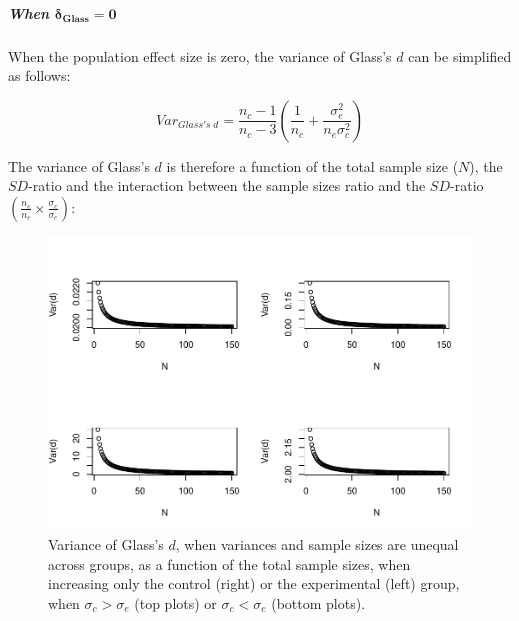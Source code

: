 \documentclass[
  english,
  man,mask]{apa6}
\let\oldsubparagraph\subparagraph
\renewcommand{\subparagraph}[1]{\oldsubparagraph{#1}\mbox{}}
\begin{document}
\hypertarget{when-bmdelta_glass-0-1}{%
\subparagraph{\texorpdfstring{When \(\bm{\delta_{Glass} = 0}\)}{When \textbackslash bm\{\textbackslash delta\_\{Glass\} = 0\}}}\label{when-bmdelta_glass-0-1}}

When the population effect size is zero, the variance of Glass's \(d\) can be simplified as follows:

\[Var_{Glass's \; d} = \frac{n_c-1}{n_c-3} \left( \frac{1}{n_c}+\frac{\sigma^2_e}{n_e\sigma^2_c}\right)\]

The variance of Glass's \(d\) is therefore a function of the total sample size (\(N\)), the \(SD\)-ratio and the interaction between the sample sizes ratio and the \(SD\)-ratio \(\left(\frac{n_c}{n_e}\times\frac{\sigma_c}{\sigma_e} \right)\):

\begin{figure}
\centering
\includegraphics{SupMat1_files/figure-latex/varglassHetunbalNsize2-1.pdf}
\caption{\label{fig:varglassHetunbalNsize2}Variance of Glass's \(d\), when variances and sample sizes are unequal across groups, as a function of the total sample sizes, when increasing only the control (right) or the experimental (left) group, when \(\sigma_c > \sigma_e\) (top plots) or \(\sigma_c < \sigma_e\) (bottom plots).}
\end{figure}
\end{document}
